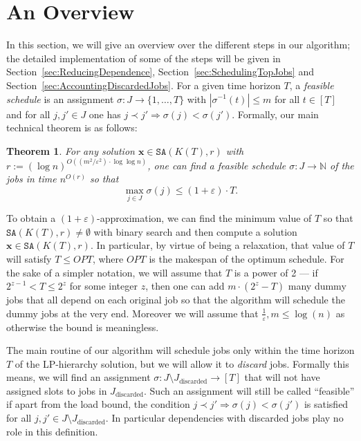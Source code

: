 \documentclass[11pt,letterpaper,oneside,english]{article}
\theoremstyle{theorem}
\newtheorem{theorem}{Theorem}
\providecommand{\setN}{\mathbb{N}}
\begin{document}
\section{An Overview}\label{sec:Overview}

In this section, we will give an overview over the different steps in our algorithm; the detailed 
implementation of some of the steps will be given in Section~\ref{sec:ReducingDependence}, Section~\ref{sec:SchedulingTopJobs} and Section~\ref{sec:AccountingDiscardedJobs}. 
For a given time horizon $T$, a \emph{feasible schedule} is an assignment $\sigma : J \to \{ 1,\ldots,T\}$
with $|\sigma^{-1}(t)| \leq m$ for all $t \in [T]$ and for all $j,j' \in J$ one has $j \prec j' \Rightarrow \sigma(j) < \sigma(j')$.
Formally, our main technical theorem is as follows: \begin{theorem} \label{thm:MainTechnicalTheorem}
For any solution $\bm{x} \in \texttt{SA}(K(T),r)$ with 
$r :=(\log n) ^{O((m^2/\varepsilon^2) \cdot \log\log n)}$,
one can find a feasible schedule $\sigma : J \to \setN$ of the jobs in 
time $n^{O(r)}$ so that 
\[
\max_{j \in J} \sigma(j) \leq (1 + \varepsilon) \cdot T.
\]
\end{theorem}
To obtain a $(1+\varepsilon)$-approximation, we can find the minimum value of $T$ so that $\texttt{SA}(K(T),r)\neq \emptyset$ 
with binary search and then compute a solution 
$\bm{x} \in \texttt{SA}(K(T),r)$. In particular, by virtue of being a relaxation, that value of $T$ will satisfy $T \leq OPT$, where 
$OPT$ is the makespan of the optimum schedule. For the sake of a simpler notation, we will assume that $T$
is a power of 2 --- if $2^{z-1} < T \leq 2^z$ for some integer $z$, then one can add $m \cdot (2^z-T)$ many dummy
jobs that all depend on each original job so that the algorithm will schedule the dummy jobs  at the
very end. Moreover we will assume that $\frac{1}{\varepsilon},m \leq \log(n)$ as otherwise the bound is meaningless.


The main routine of our algorithm will schedule jobs only within the time horizon $T$ of the LP-hierarchy solution, but we will allow it to \emph{discard} jobs. Formally this
means, we will find an assignment $\sigma : J \setminus J_{\textrm{discarded}} \to [T]$ that will not have assigned slots to jobs 
in $J_{\textrm{discarded}}$. Such an assignment will still be called ``feasible'' if apart from the load bound, 
the condition $j \prec j' \Rightarrow \sigma(j) < \sigma(j')$ is satisfied for all $j,j' \in J \setminus J_{\textrm{discarded}}$. 
In particular dependencies with discarded jobs play no role in this definition. 
\end{document}
